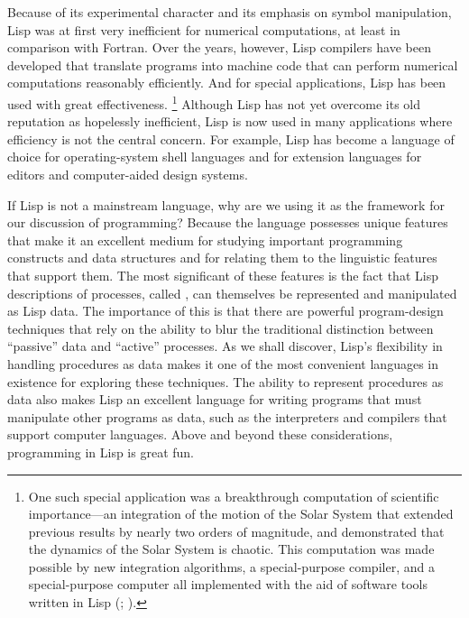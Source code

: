 Because of its experimental character and its emphasis on symbol manipulation, Lisp was at first very inefficient for numerical computations, at least in comparison with Fortran.
Over the years, however, Lisp compilers have been developed that translate programs into machine code that can perform numerical computations reasonably efficiently.
And for special applications, Lisp has been used with great effectiveness.%
\footnote{
	One such special application was a breakthrough computation of scientific importance---an integration of the motion of the Solar System that extended previous results by nearly two orders of magnitude, and demonstrated that the dynamics of the Solar System is chaotic.
	This computation was made possible by new integration algorithms, a special-purpose compiler, and a special-purpose computer all implemented with the aid of software tools written in Lisp (; ).
}
Although Lisp has not yet overcome its old reputation as hopelessly inefficient, Lisp is now used in many applications where efficiency is not the central concern.
For example, Lisp has become a language of choice for operating-system shell languages and for extension languages for editors and computer-aided design systems.

If Lisp is not a mainstream language, why are we using it as the framework for our discussion of programming?
Because the language possesses unique features that make it an excellent medium for studying important programming constructs and data structures and for relating them to the linguistic features that support them.
The most significant of these features is the fact that Lisp descriptions of processes, called , can themselves be represented and manipulated as Lisp data.
The importance of this is that there are powerful program-design techniques that rely on the ability to blur the traditional distinction between “passive” data and “active” processes.
As we shall discover, Lisp’s flexibility in handling procedures as data makes it one of the most convenient languages in existence for exploring these techniques.
The ability to represent procedures as data also makes Lisp an excellent language for writing programs that must manipulate other programs as data, such as the interpreters and compilers that support computer languages.
Above and beyond these considerations, programming in Lisp is great fun.




